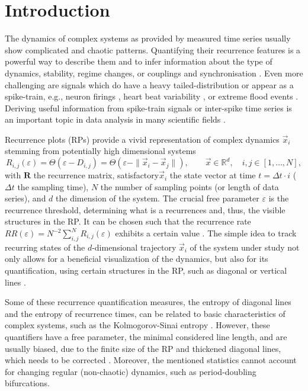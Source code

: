 \documentclass[entropy,article,submit,pdftex,moreauthors]{Definitions/mdpi}
\begin{document}
\section{Introduction}\label{sec_tau_rr_intro}

The dynamics of complex systems as provided by measured time series usually show complicated and chaotic patterns.
Quantifying their recurrence features is a powerful way to describe them and to infer information about 
the type of dynamics, stability, regime changes, or couplings and synchronisation \cite{marwan2007,marwan2008epjst,webber2015}.
Even more challenging are signals which do have a heavy tailed-distribution or appear as a spike-train,
e.g., neuron firings \cite{Dummer2014,Orcioni2020}, heart beat variability \cite{marwan2002herz}, 
or extreme flood events \cite{banerjee2021}.
Deriving useful information from spike-train signals or inter-spike time series is an important
topic in data analysis in many scientific fields \cite{Kajikawa2005,Dummer2014,Orcioni2020,Canale2021}.

Recurrence plots (RPs) provide a vivid representation of complex dynamics $\vec{x}_i$ stemming from potentially high dimensional systems \cite{marwan2007}
\begin{equation}\label{eq_rp_definition}
R_{i,j}(\varepsilon) = \Theta\left(\varepsilon - D_{i,j}\right) 
= \Theta\left(\varepsilon - \| \vec{x}_i - \vec{x}_j\|\right), \qquad \vec{x} \in \mathbb{R}^d, \quad i,j \in [1,\ldots, N],
\end{equation}
with $\mathbf{R}$ the recurrence matrix, satisfactory$\vec{x}_i$ the state vector at time 
$t = \Delta t \cdot i$ ($\Delta t$ the sampling time), $N$ the number of
sampling points (or length of data series), and $d$ the dimension of the system.
The crucial free parameter $\varepsilon$ is the recurrence threshold, determining what is a recurrences
and, thus, the visible structures in the RP. It can be chosen such that the recurrence rate 
$RR(\varepsilon)=N^{-2}\sum_{i,j}^N R_{i,j}(\varepsilon)$ exhibits a certain value \cite{kraemer2018}.
The simple idea to track recurring states of the $d$-dimensional trajectory $\vec{x}_i$ of the system under study not only allows for a beneficial visualization of the dynamics, 
but also for its 
quantification, using certain structures in the RP, such as diagonal or vertical lines \cite{marwan2007}. 

Some of these recurrence quantification measures, the entropy of diagonal lines and the entropy of 
recurrence times, can be related to basic characteristics of complex systems, such as the Kolmogorov-Sinai entropy \cite{march2005,baptista2010}. However, these quantifiers have a free parameter, the minimal considered line length, and 
are usually biased, due to the finite size of the RP and thickened diagonal lines, which needs to be corrected \cite{Kraemer2019}. Moreover, the mentioned statistics cannot account for 
changing regular (non-chaotic) dynamics, such as period-doubling bifurcations.
\end{document}
